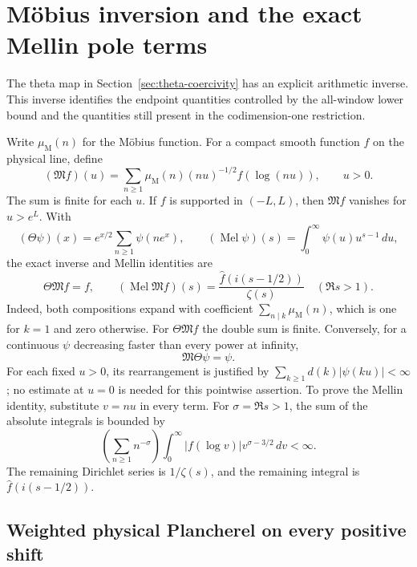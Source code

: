 \section{M\"obius inversion and the exact Mellin pole terms}
\label{sec:mobius-endpoint}

The theta map in Section~\ref{sec:theta-coercivity} has an explicit
arithmetic inverse. This inverse identifies the endpoint quantities
controlled by the all-window lower bound and the quantities still
present in the codimension-one restriction.

Write \(\mu_{\mathrm M}(n)\) for the M\"obius function. For a compact
smooth function \(f\) on the physical line, define
\begin{equation}\label{eq:mobius-map}
 (\mathfrak M f)(u)
  =\sum_{n\ge1}\mu_{\mathrm M}(n)(nu)^{-1/2}f(\log(nu)),
 \qquad u>0.
\end{equation}
The sum is finite for each \(u\). If \(f\) is supported in
\((-L,L)\), then \(\mathfrak M f\) vanishes for \(u>e^L\).
With
\[
 (\Theta\psi)(x)=e^{x/2}\sum_{n\ge1}\psi(ne^x),
 \qquad
 (\operatorname{Mel}\psi)(s)=\int_0^\infty\psi(u)u^{s-1}\,du,
\]
the exact inverse and Mellin identities are
\begin{equation}\label{eq:mobius-inverse}
 \Theta\mathfrak M f=f,
 \qquad
 (\operatorname{Mel}\mathfrak M f)(s)
    =\frac{\widehat f(i(s-1/2))}{\zeta(s)}
       \quad(\Re s>1).
\end{equation}
Indeed, both compositions expand with coefficient
\(\sum_{n\mid k}\mu_{\mathrm M}(n)\), which is one for \(k=1\)
and zero otherwise. For \(\Theta\mathfrak M f\) the double sum is
finite. Conversely, for a continuous \(\psi\) decreasing faster
than every power at infinity,
\begin{equation}\label{eq:mobius-other-inverse}
 \mathfrak M\Theta\psi=\psi.
\end{equation}
For each fixed \(u>0\), its rearrangement is justified by
\(\sum_{k\ge1}d(k)|\psi(ku)|<\infty\); no estimate at \(u=0\)
is needed for this pointwise assertion. To prove the Mellin identity,
substitute \(v=nu\) in every term. For \(\sigma=\Re s>1\),
the sum of the absolute integrals is bounded by
\[
 \left(\sum_{n\ge1}n^{-\sigma}\right)
 \int_0^\infty |f(\log v)|v^{\sigma-3/2}\,dv<\infty.
\]
The remaining Dirichlet series is \(1/\zeta(s)\), and the remaining
integral is \(\widehat f(i(s-1/2))\).

\subsection{Weighted physical Plancherel on every positive shift}

